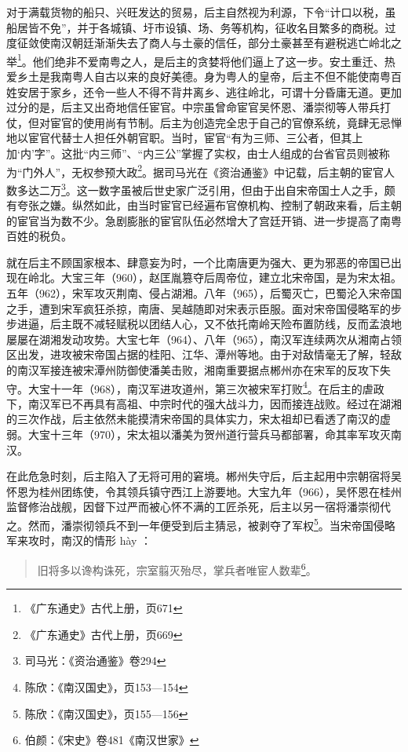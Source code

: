 对于满载货物的船只、兴旺发达的贸易，后主自然视为利源，下令“计口以税，虽船居皆不免”，并于各城镇、圩市设镇、场、务等机构，征收名目繁多的商税。过度征敛使南汉朝廷渐渐失去了商人与土豪的信任，部分土豪甚至有避税逃亡岭北之举\footnote{《广东通史》古代上册，页671}。他们绝非不爱南粤之人，是后主的贪婪将他们逼上了这一步。安土重迁、热爱乡土是我南粤人自古以来的良好美德。身为粤人的皇帝，后主不但不能使南粤百姓安居于家乡，还令一些人不得不背井离乡、逃往岭北，可谓十分昏庸无道。更加过分的是，后主又出奇地信任宦官。中宗虽曾命宦官吴怀恩、潘崇彻等人带兵打仗，但对宦官的使用尚有节制。后主为创造完全忠于自己的官僚系统，竟肆无忌惮地以宦官代替士人担任外朝官职。当时，宦官“有为三师、三公者，但其上加‘内’字”。这批“内三师”、“内三公”掌握了实权，由士人组成的台省官员则被称为“门外人”，无权参预大政\footnote{《广东通史》古代上册，页669}。据司马光在《资治通鉴》中记载，后主朝的宦官人数多达二万\footnote{司马光：《资治通鉴》卷294}。这一数字虽被后世史家广泛引用，但由于出自宋帝国士人之手，颇有夸张之嫌。纵然如此，由当时宦官已经遍布官僚机构、控制了朝政来看，后主朝的宦官当为数不少。急剧膨胀的宦官队伍必然增大了宫廷开销、进一步提高了南粤百姓的税负。

就在后主不顾国家根本、肆意妄为时，一个比南唐更为强大、更为邪恶的帝国已出现在岭北。大宝三年（960），赵匡胤篡夺后周帝位，建立北宋帝国，是为宋太祖。五年（962），宋军攻灭荆南、侵占湖湘。八年（965），后蜀灭亡，巴蜀沦入宋帝国之手，遭到宋军疯狂杀掠，南唐、吴越随即对宋表示臣服。面对宋帝国侵略军的步步进逼，后主既不减轻赋税以团结人心，又不依托南岭天险布置防线，反而孟浪地屡屡在湖湘发动攻势。大宝七年（964）、八年（965），南汉军连续两次从湘南占领区出发，进攻被宋帝国占据的桂阳、江华、潭州等地。由于对敌情毫无了解，轻敌的南汉军接连被宋潭州防御使潘美击败，湘南重要据点郴州亦在宋军的反攻下失守。大宝十一年（968），南汉军进攻道州，第三次被宋军打败\footnote{陈欣：《南汉国史》，页153—154}。在后主的虐政下，南汉军已不再具有高祖、中宗时代的强大战斗力，因而接连战败。经过在湖湘的三次作战，后主依然未能摸清宋帝国的具体实力，宋太祖却已看透了南汉的虚弱。大宝十三年（970），宋太祖以潘美为贺州道行营兵马都部署，命其率军攻灭南汉。

在此危急时刻，后主陷入了无将可用的窘境。郴州失守后，后主起用中宗朝宿将吴怀恩为桂州团练使，令其领兵镇守西江上游要地。大宝九年（966），吴怀恩在桂州监督修治战舰，因督下过严而被心怀不满的工匠杀死，后主以另一宿将潘崇彻代之。然而，潘崇彻领兵不到一年便受到后主猜忌，被剥夺了军权\footnote{陈欣：《南汉国史》，页155—156}。当宋帝国侵略军来攻时，南汉的情形 hày ：

\begin{quote}
	旧将多以谗构诛死，宗室翦灭殆尽，掌兵者唯宦人数辈\footnote{伯颜：《宋史》卷481《南汉世家》}。
\end{quote}



